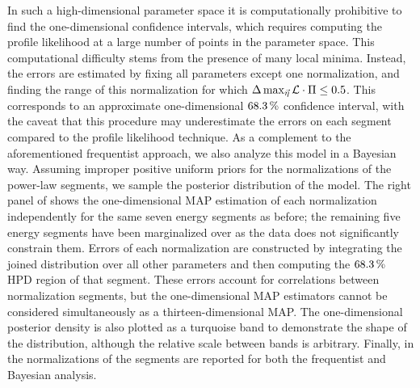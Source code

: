 In such a high-dimensional parameter space it is computationally prohibitive to find the one-dimensional confidence intervals, which requires computing the profile likelihood at a large number of points in the parameter space.
This computational difficulty stems from the presence of many local minima.
Instead, the errors are estimated by fixing all parameters except one normalization, and finding the range of this normalization for which $\Delta\max_{\vec\eta}\mathcal{L}\cdot\Pi\leq 0.5$.
This corresponds to an approximate one-dimensional $\SI{68.3}\percent$ confidence interval, with the caveat that this procedure may underestimate the errors on each segment compared to the profile likelihood technique.
As a complement to the aforementioned frequentist approach, we also analyze this model in a Bayesian way.
Assuming improper positive uniform priors for the normalizations of the power-law segments, we sample the posterior distribution of the model.
The right panel of  shows the one-dimensional MAP estimation of each normalization independently for the same seven energy segments as before; the remaining five energy segments have been marginalized over as the data does not significantly constrain them.
Errors of each normalization are constructed by integrating the joined distribution over all other parameters and then computing the $\SI{68.3}\percent$ HPD region of that segment.
These errors account for correlations between normalization segments, but the one-dimensional MAP estimators cannot be considered simultaneously as a thirteen-dimensional MAP.
The one-dimensional posterior density is also plotted as a turquoise band to demonstrate the shape of the distribution, although the relative scale between bands is arbitrary.
Finally, in  the normalizations of the segments are reported for both the frequentist and Bayesian analysis.

